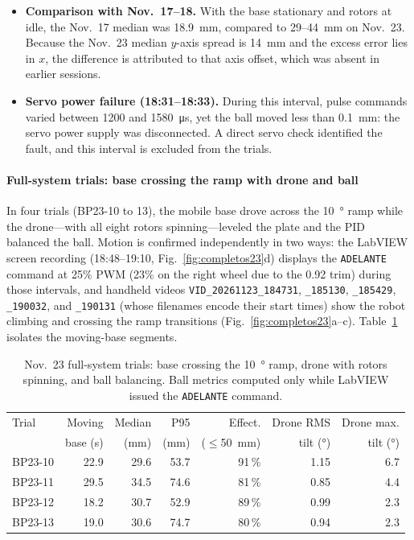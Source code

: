 \begin{itemize}
  \item \textbf{Comparison with Nov.~17--18.} With the base stationary and rotors at idle, the Nov.~17 median was \SI{18.9}{\milli\metre}, compared to 29--\SI{44}{\milli\metre} on Nov.~23. Because the Nov.~23 median $y$-axis spread is \SI{14}{\milli\metre} and the excess error lies in $x$, the difference is attributed to that axis offset, which was absent in earlier sessions.
  \item \textbf{Servo power failure (18:31--18:33).} During this interval, pulse commands varied between 1200 and \SI{1580}{\micro\second}, yet the ball moved less than \SI{0.1}{\milli\metre}: the servo power supply was disconnected. A direct servo check identified the fault, and this interval is excluded from the trials.
\end{itemize}

\paragraph{Full-system trials: base crossing the ramp with drone and ball} In four trials (BP23-10 to 13), the mobile base drove across the \SI{10}{\degree} ramp while the drone---with all eight rotors spinning---leveled the plate and the PID balanced the ball. Motion is confirmed independently in two ways: the LabVIEW screen recording (18:48--19:10, Fig.~\ref{fig:completos23}d) displays the \texttt{ADELANTE} command at 25\% PWM (23\% on the right wheel due to the 0.92 trim) during those intervals, and handheld videos \texttt{VID\_20261123\_184731}, \texttt{\_185130}, \texttt{\_185429}, \texttt{\_190032}, and \texttt{\_190131} (whose filenames encode their start times) show the robot climbing and crossing the ramp transitions (Fig.~\ref{fig:completos23}a--c). Table~\ref{tab:completos23} isolates the moving-base segments.

\begin{table}[!htbp]
\centering
\caption{Nov.~23 full-system trials: base crossing the \SI{10}{\degree} ramp, drone with rotors spinning, and ball balancing. Ball metrics computed only while LabVIEW issued the \texttt{ADELANTE} command.}
\label{tab:completos23}
\small
\begin{tabular}{@{}lrrrrrr@{}}
\toprule
Trial & Moving & Median & P95 & Effect. & Drone RMS & Drone max. \\
 & base (s) & (mm) & (mm) & ($\le$\SI{50}{\milli\metre}) & tilt (\si{\degree}) & tilt (\si{\degree}) \\
\midrule
BP23-10 & 22.9 & 29.6 & 53.7 & 91\,\% & 1.15 & 6.7 \\
BP23-11 & 29.5 & 34.5 & 74.6 & 81\,\% & 0.85 & 4.4 \\
BP23-12 & 18.2 & 30.7 & 52.9 & 89\,\% & 0.99 & 2.3 \\
BP23-13 & 19.0 & 30.6 & 74.7 & 80\,\% & 0.94 & 2.3 \\
\bottomrule
\end{tabular}
\end{table}

